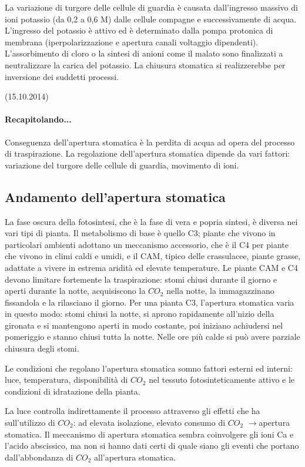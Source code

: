 \documentclass[a4paper,12pt]{book}
\newcommand{\lfreccia}{\ensuremath{\longrightarrow}}
\begin{document}
La variazione di turgore delle cellule di guardia è causata dall’ingresso massivo di ioni potassio (da 0,2 a 0,6 M) dalle cellule compagne e successivamente di acqua. L’ingresso del potassio è attivo ed è determinato dalla pompa protonica di membrana (iperpolarizzazione e apertura canali voltaggio dipendenti). L’assorbimento di cloro o la sintesi di anioni come il malato sono finalizzati a neutralizzare la carica del potassio. La chiusura stomatica si realizzerebbe per inversione dei suddetti processi.

(15.10.2014)
\paragraph{Recapitolando...}
Conseguenza dell'apertura stomatica è la perdita di acqua ad opera del processo di traspirazione. 
La regolazione dell'apertura stomatica dipende da vari fattori: variazione del turgore delle cellule di guardia, movimento di ioni.

\subsection{Andamento dell'apertura stomatica}
La fase oscura della fotosintesi, che è la fase di vera e popria sintesi, è diversa nei vari tipi di pianta. Il metabolismo di base è quello C3; piante che vivono in particolari ambienti adottano un meccanismo accessorio, che è il C4 per piante che vivono in climi caldi e umidi, e il CAM, tipico delle crassulacee, piante grasse, adattate a vivere in estrema aridità ed elevate temperature. Le piante CAM e C4 devono limitare fortemente la traspirazione: stomi chiusi durante il giorno e aperti durante la notte, acquisiscono la $CO_{2}$ nella notte, la immagazzinano fissandola e la rilasciano il giorno. 
Per una pianta C3, l'apertura stomatica varia in questo modo: stomi chiusi la notte, si aprono rapidamente all'nizio della gironata e si mantengono aperti in modo costante, poi iniziano  achiudersi nel pomeriggio e stanno chiusi tutta la notte. Nelle ore più calde si può avere parziale chiusura degli stomi.

Le condizioni che regolano l'apertura stomatica somno fattori esterni ed interni: luce, temperatura, disponibilità di $CO_{2}$ nel tessuto fotosinteticamente attivo e le condizioni di idratazione della pianta.
 
La luce controlla indirettamente il processo attraverso gli effetti che ha sull'utilizzo di $CO_{2}$: ad elevata isolazione, elevato consumo di $CO_{2}$ \lfreccia apertura stomatica.
Il meccanismo di apertura stomatica sembra coinvolgere gli ioni Ca e l'acido abscissico, ma non si hanno dati certi di quale siano gli eventi che portano dall'abbondanza di $CO_{2}$ all'apertura stomatica.
\end{document}

